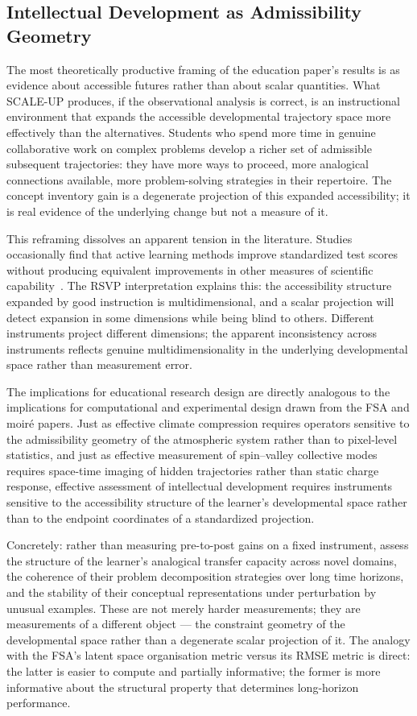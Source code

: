 \documentclass[11pt,a4paper]{article}
\theoremstyle{plain}
\theoremstyle{definition}
\theoremstyle{remark}
\begin{document}
\subsection{Intellectual Development as Admissibility Geometry}

The most theoretically productive framing of the education paper's results
is as evidence about accessible futures rather than about scalar quantities.
What SCALE-UP produces, if the observational analysis is correct, is an
instructional environment that expands the accessible developmental trajectory
space more effectively than the alternatives. Students who spend more time
in genuine collaborative work on complex problems develop a richer set of
admissible subsequent trajectories: they have more ways to proceed, more
analogical connections available, more problem-solving strategies in their
repertoire. The concept inventory gain is a degenerate projection of this
expanded accessibility; it is real evidence of the underlying change but not
a measure of it.

This reframing dissolves an apparent tension in the literature. Studies
occasionally find that active learning methods improve standardized test
scores without producing equivalent improvements in other measures of
scientific capability~\cite{Andrews2011}. The RSVP interpretation explains
this: the accessibility structure expanded by good instruction is
multidimensional, and a scalar projection will detect expansion in some
dimensions while being blind to others. Different instruments project
different dimensions; the apparent inconsistency across instruments reflects
genuine multidimensionality in the underlying developmental space rather than
measurement error.

The implications for educational research design are directly analogous to
the implications for computational and experimental design drawn from the
FSA and moiré papers. Just as effective climate compression requires
operators sensitive to the admissibility geometry of the atmospheric system
rather than to pixel-level statistics, and just as effective measurement
of spin--valley collective modes requires space-time imaging of hidden
trajectories rather than static charge response, effective assessment of
intellectual development requires instruments sensitive to the accessibility
structure of the learner's developmental space rather than to the endpoint
coordinates of a standardized projection.

Concretely: rather than measuring pre-to-post gains on a fixed instrument,
assess the structure of the learner's analogical transfer capacity across
novel domains, the coherence of their problem decomposition strategies over
long time horizons, and the stability of their conceptual representations
under perturbation by unusual examples. These are not merely harder
measurements; they are measurements of a different object --- the constraint
geometry of the developmental space rather than a degenerate scalar
projection of it. The analogy with the FSA's latent space organisation
metric versus its RMSE metric is direct: the latter is easier to compute
and partially informative; the former is more informative about the
structural property that determines long-horizon performance.
\end{document}
